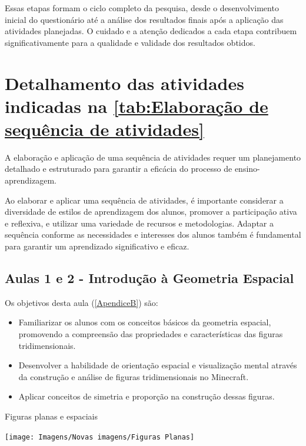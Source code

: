 Essas etapas formam o ciclo completo da pesquisa, desde o desenvolvimento inicial do questionário até a análise dos resultados finais após a aplicação das atividades planejadas. O cuidado e a atenção dedicados a cada etapa contribuem significativamente para a qualidade e validade dos resultados obtidos.

\section{Detalhamento das atividades indicadas na \autoref{tab:Elaboração de sequência de atividades}}

A elaboração e aplicação de uma sequência de atividades requer um planejamento detalhado e estruturado para garantir a eficácia do processo de ensino-aprendizagem.

Ao elaborar e aplicar uma sequência de atividades, é importante considerar a diversidade de estilos de aprendizagem dos alunos, promover a participação ativa e reflexiva, e utilizar uma variedade de recursos e metodologias. Adaptar a sequência conforme as necessidades e interesses dos alunos também é fundamental para garantir um aprendizado significativo e eficaz.

\subsection{Aulas 1 e 2 - Introdução à Geometria Espacial}

Os objetivos desta aula (\autoref{ApendiceB}) são:

\begin{itemize}
    \item Familiarizar os alunos com os conceitos básicos da geometria espacial, promovendo a compreensão das propriedades e características das figuras tridimensionais.
    \item Desenvolver a habilidade de orientação espacial e visualização mental através da construção e análise de figuras tridimensionais no Minecraft.
    \item Aplicar conceitos de simetria e proporção na construção dessas figuras.
\end{itemize}

\begin{CenteredFigure}
    \caption{Figuras planas e espaciais} \label{fig:00-Figuras planas e espaciais}
    \texttt{[image: Imagens/Novas imagens/Figuras Planas]}
    \legend{\autoria}
\end{CenteredFigure}

